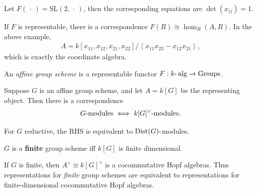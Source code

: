 \begin{example}

\begin{example}

Let \(F({\,\cdot\,}) = {\text{SL}}(2, {\,\cdot\,})\), then the
corresponding equations are \(\det (x_{ij}) = 1\).

\end{example}

\end{example}

If \(F\) is representable, there is a correspondence
\(F(R) \cong \hom_R(A, R)\). In the above example,
\begin{align*}A = k[x_{11}, x_{12}, x_{21}, x_{22}] / \left\langle{x_{11} x_{22} - x_{12}x_{21}}\right\rangle,\end{align*}
which is exactly the coordinate algebra.

\begin{definition}

\begin{definition}

An \emph{affine group scheme} is a representable functor
\(F:k{\hbox{-}}\operatorname{alg}\to{\text{Groups}}\).

\end{definition}

\end{definition}

Suppose \(G\) is an affine group scheme, and let \(A = k[G]\) be the
representing object. Then there is a correspondence
\begin{align*}   G{\hbox{-}}\text{modules} \iff k[G]^\vee{\hbox{-}}\text{modules} .\end{align*}

For \(G\) reductive, the RHS is equivalent to
\(\operatorname{Dist}(G){\hbox{-}}\)modules.

\begin{definition}

\begin{definition}

\(G\) is a \textbf{finite} group scheme iff \(k[G]\) is finite
dimensional.

\end{definition}

\end{definition}

If \(G\) is finite, then \(A^\vee\cong k[G]^\vee\) is a cocommutative
Hopf algebras. Thus representations for \emph{finite} group schemes are
equivalent to representations for finite-dimensional cocommutative Hopf
algebras.

